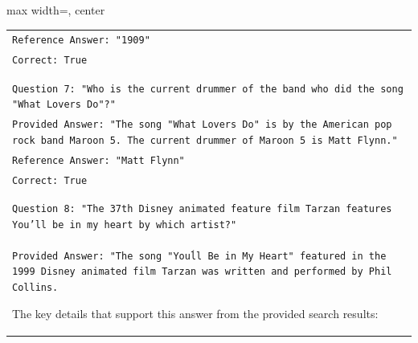 \documentclass[11pt]{article}
\begin{document}
\begin{table}[ht]
\begin{adjustbox}{max width=\textwidth, center}
\begin{tabular}{>{\raggedright\arraybackslash\tt}p{}<{}}
Reference Answer: "1909"\\
Correct: True\\
\\
\\
Question 7: "Who is the current drummer of the band who did the song "What Lovers Do"?"\\
Provided Answer: "The song "What Lovers Do" is by the American pop rock band Maroon 5. The current drummer of Maroon 5 is Matt Flynn."\\
Reference Answer: "Matt Flynn"\\
Correct: True\\
\\
\\
Question 8: "The 37th Disney animated feature film Tarzan features You'll be in my heart by which artist?"\\
Provided Answer: "The song "You\'ll Be in My Heart" featured in the 1999 Disney animated film Tarzan was written and performed by Phil Collins.

The key details that support this answer from the provided search results:


\end{tabular}
\end{adjustbox}
\end{table}
\end{document}
